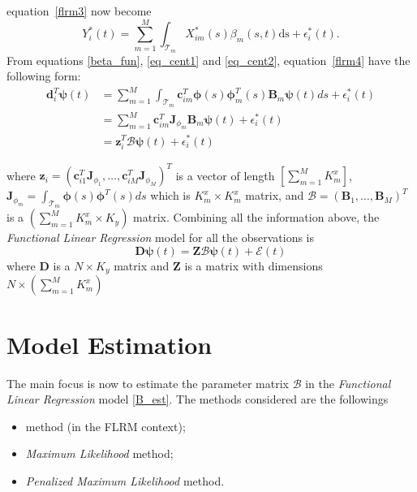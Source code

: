 equation~\eqref{flrm3} now become
\begin{equation}\label{flrm4}
Y^{*}_i(t) = \sum_{m=1}^{M} \int_{\mathcal{T}_m} X^{*}_{im}(s) \beta_{m}(s,t)\mathrm{ds} + \epsilon^{*}_i(t). 
\end{equation}
From equations \eqref{beta_fun}, \eqref{eq_cent1} and \eqref{eq_cent2}, equation~\eqref{flrm4} have the following form:
\begin{align}
\bm{d}_{i}^T \bm{\psi}(t) &= \sum_{m=1}^{M} \int_{\mathcal{T}_m} \bm{c}^T_{im} \bm{\phi}(s) \bm{\phi}^T_{m}(s) \bm{B}_m \bm{\psi}(t)ds + \epsilon^{*}_i(t) \nonumber \\
						  &= \sum_{m=1}^{M} \bm{c}^T_{im} \bm{J}_{\phi_m} \bm{B}_m \bm{\psi}(t) + \epsilon^{*}_i(t) \nonumber \\
						  &= \bm{z}_i^T \bm{\mathcal{B}} \bm{\psi}(t)+ \epsilon^{*}_i(t) \label{eq:flrm5} 
\end{align}

where $\bm{z}_i = \left(\bm{c}^T_{i1} \bm{J}_{\phi_1},\dots,\bm{c}^T_{iM} \bm{J}_{\phi_M}\right)^T$ is a vector of length $\left[\sum_{m=1}^{M} K_m^{x}\right]$,\\  $\bm{J}_{\phi_m} = \int_{\mathcal{T}_m} \bm{\phi}(s) \bm{\phi}^T(s)ds$ which is $K_m^{x} \times K_m^{x}$ matrix, and $\bm{\mathcal{B}} = \left(\bm{B}_1,\dots,\bm{B}_M\right)^T$ is a $\left(\sum_{m=1}^{M} K_m^{x} \times K_{y}\right)$ matrix. Combining all the information above, the \textit{Functional Linear Regression} model for all the observations is
\begin{equation}\label{B_est}
\bm{D} \bm{\psi}(t) = \bm{Z} \bm{\mathcal{B}} \bm{\psi}(t) + \bm{\mathcal{E}}(t) 
\end{equation}
where $\bm{D}$ is a $N \times K_y$ matrix and $\bm{Z}$ is a matrix with dimensions $N \times \left(\sum_{m=1}^{M} K_m^{x}\right)$
\clearpage
\section{Model Estimation}
The main focus is now to estimate the parameter matrix $\bm{\mathcal{B}}$ in the \textit{Functional Linear Regression} model \eqref{B_est}. The methods considered are the followings
\begin{itemize}
\item {} method (in the FLRM context);
\item \textit{Maximum Likelihood} method;
\item \textit{Penalized Maximum Likelihood} method.
\end{itemize}

